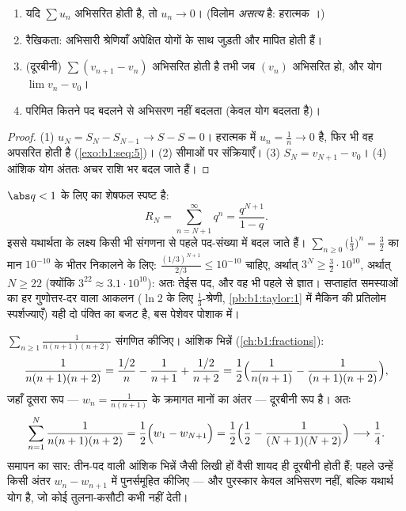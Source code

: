 \begin{proposition}[पहले तथ्य]\label{prop:b1:series:first}
\begin{enumerate}
  \item यदि $\sum u_n$ अभिसरित होती है, तो $u_n \to 0$। (विलोम \emph{असत्य}
  है: हरात्मक ।)
  \item रैखिकता: अभिसारी श्रेणियाँ अपेक्षित योगों के साथ जुड़ती और मापित
  होती हैं।
  \item (दूरबीनी) $\sum (v_{n+1} - v_n)$ अभिसरित होती
  है तभी जब $(v_n)$ अभिसरित हो, और योग $\lim v_n - v_0$।
  \item परिमित कितने पद बदलने से अभिसरण नहीं बदलता (केवल योग बदलता है)।
\end{enumerate}
\end{proposition}

\begin{proof}
(1) $u_N = S_N - S_{N-1} \to S - S = 0$। हरात्मक  में $u_n = \frac1n
\to 0$ है, फिर भी वह अपसरित होती है (\cref{exo:b1:seq:5})। (2) सीमाओं पर
संक्रियाएँ। (3) $S_N = v_{N+1} - v_0$। (4) आंशिक योग अंततः अचर राशि भर बदल
जाते हैं।
\end{proof}

\begin{example}[गुणोत्तर शेषफल से अंकों की योजना]\label{ex:b1:series:georemainder}
$\abs q < 1$ के लिए  का शेषफल स्पष्ट है:
\[
R_N = \sum_{n = N+1}^{\infty} q^n = \frac{q^{N+1}}{1 - q} .
\]
इससे यथार्थता के लक्ष्य किसी भी संगणना से पहले पद-संख्या में बदल जाते हैं।
$\sum_{n\geq0} \bigl(\frac13\bigr)^n = \frac32$ का मान $10^{-10}$ के भीतर
निकालने के लिए: $\frac{(1/3)^{N+1}}{2/3} \leq 10^{-10}$ चाहिए, अर्थात्
$3^{N} \geq \frac{3}{2}\cdot 10^{10}$, अर्थात् $N \geq 22$ (क्योंकि $3^{22}
\approx 3.1\cdot10^{10}$): अतः तेईस पद, और वह भी पहले से ज्ञात। सप्ताहांत
समस्याओं का हर गुणोत्तर-दर वाला आकलन ($\ln 2$ के लिए $\frac13$-श्रेणी,
\cref{pb:b1:taylor:1} में मैकिन की प्रतिलोम स्पर्शज्याएँ) यही दो पंक्ति का
बजट है, बस पेशेवर पोशाक में।
\end{example}

\begin{example}[एक लंबी दूरबीन]\label{ex:b1:series:telescope3}
$\sum_{n\geq1} \frac{1}{n(n+1)(n+2)}$ संगणित कीजिए। आंशिक भिन्नें
(\cref{ch:b1:fractions}):
\[
\frac{1}{n(n+1)(n+2)}
= \frac{1/2}{n} - \frac{1}{n+1} + \frac{1/2}{n+2}
= \frac12\Bigl(\frac{1}{n(n+1)} - \frac{1}{(n+1)(n+2)}\Bigr),
\]
जहाँ दूसरा रूप --- $w_n = \frac{1}{n(n+1)}$ के क्रमागत मानों का अंतर ---
दूरबीनी रूप है। अतः
\[
\sum_{n=1}^{N} \frac{1}{n(n+1)(n+2)}
= \frac12\Bigl(w_1 - w_{N+1}\Bigr)
= \frac12\Bigl(\frac12 - \frac{1}{(N+1)(N+2)}\Bigr)
\longrightarrow \frac14 .
\]
समापन का सार: तीन-पद वाली आंशिक भिन्नें जैसी लिखी हों वैसी शायद ही दूरबीनी
होती हैं; पहले उन्हें किसी अंतर $w_n - w_{n+1}$ में पुनर्समूहित कीजिए --- और
पुरस्कार केवल अभिसरण नहीं, बल्कि यथार्थ योग है, जो कोई तुलना-कसौटी कभी नहीं
देती।
\end{example}

